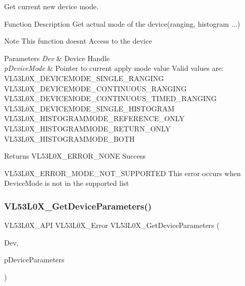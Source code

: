 Get current new device mode. 

\begin{DoxyParagraph}{Function Description}
Get actual mode of the device(ranging, histogram ...)
\end{DoxyParagraph}
\begin{DoxyNote}{Note}
This function doesn\textquotesingle{}t Access to the device
\end{DoxyNote}

\begin{DoxyParams}{Parameters}
{\em Dev} & Device Handle \\
\hline
{\em p\+Device\+Mode} & Pointer to current apply mode value Valid values are\+: V\+L53\+L0\+X\+\_\+\+D\+E\+V\+I\+C\+E\+M\+O\+D\+E\+\_\+\+S\+I\+N\+G\+L\+E\+\_\+\+R\+A\+N\+G\+I\+NG V\+L53\+L0\+X\+\_\+\+D\+E\+V\+I\+C\+E\+M\+O\+D\+E\+\_\+\+C\+O\+N\+T\+I\+N\+U\+O\+U\+S\+\_\+\+R\+A\+N\+G\+I\+NG V\+L53\+L0\+X\+\_\+\+D\+E\+V\+I\+C\+E\+M\+O\+D\+E\+\_\+\+C\+O\+N\+T\+I\+N\+U\+O\+U\+S\+\_\+\+T\+I\+M\+E\+D\+\_\+\+R\+A\+N\+G\+I\+NG V\+L53\+L0\+X\+\_\+\+D\+E\+V\+I\+C\+E\+M\+O\+D\+E\+\_\+\+S\+I\+N\+G\+L\+E\+\_\+\+H\+I\+S\+T\+O\+G\+R\+AM V\+L53\+L0\+X\+\_\+\+H\+I\+S\+T\+O\+G\+R\+A\+M\+M\+O\+D\+E\+\_\+\+R\+E\+F\+E\+R\+E\+N\+C\+E\+\_\+\+O\+N\+LY V\+L53\+L0\+X\+\_\+\+H\+I\+S\+T\+O\+G\+R\+A\+M\+M\+O\+D\+E\+\_\+\+R\+E\+T\+U\+R\+N\+\_\+\+O\+N\+LY V\+L53\+L0\+X\+\_\+\+H\+I\+S\+T\+O\+G\+R\+A\+M\+M\+O\+D\+E\+\_\+\+B\+O\+TH\\
\hline
\end{DoxyParams}
\begin{DoxyReturn}{Returns}
V\+L53\+L0\+X\+\_\+\+E\+R\+R\+O\+R\+\_\+\+N\+O\+NE Success 

V\+L53\+L0\+X\+\_\+\+E\+R\+R\+O\+R\+\_\+\+M\+O\+D\+E\+\_\+\+N\+O\+T\+\_\+\+S\+U\+P\+P\+O\+R\+T\+ED This error occurs when Device\+Mode is not in the supported list 
\end{DoxyReturn}
\mbox{\label{group__VL53L0X__parameters__group_ga77d631bab7c544b6c8bcd725f224f05d}} 
\subsubsection{\texorpdfstring{V\+L53\+L0\+X\+\_\+\+Get\+Device\+Parameters()}{VL53L0X\_GetDeviceParameters()}}
{\footnotesize\ttfamily V\+L53\+L0\+X\+\_\+\+A\+PI V\+L53\+L0\+X\+\_\+\+Error V\+L53\+L0\+X\+\_\+\+Get\+Device\+Parameters (\begin{DoxyParamCaption}\item[{\hyperlink{group__VL53L0X__platform__group_ga2d6405308b1dd524b462f1b8fb97d167}{V\+L53\+L0\+X\+\_\+\+D\+EV}}]{Dev,  }\item[{\hyperlink{structVL53L0X__DeviceParameters__t}{V\+L53\+L0\+X\+\_\+\+Device\+Parameters\+\_\+t} $\ast$}]{p\+Device\+Parameters }\end{DoxyParamCaption})}



